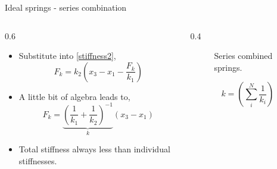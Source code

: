 \documentclass[11pt,aspectratio=169,handout]{beamer}
\begin{document}
\begin{frame}[c]{Ideal springs - series combination}
	\begin{columns}[T]
		\begin{column}{0.6\textwidth}
			\begin{itemize}
				\item Substitute into \ref{stiffness2},
				\begin{equation}
					F_k = k_2(x_3 -x_1 -\frac{F_k}{k_1})
				\end{equation}
				\item A little bit of algebra leads to,
				\begin{equation}
					F_k =\underbrace{ \left(\frac{1}{k_1}+\frac{1}{k_2}\right)^{-1} }_{k}(x_3-x_1)
				\end{equation} 
			\item Total stiffness always less than individual stiffnesses.
			\end{itemize}
		\end{column}
		\begin{column}{0.4\textwidth}
			\begin{figure}
				\centering
				
				\caption{Series combined springs.}
			\end{figure}
		\vspace{0.5cm}
		\begin{equation}
			k = \left(\sum_i^N \frac{1}{k_i}\right)
		\end{equation}
		\end{column}
	\end{columns}
\end{frame}
\end{document}

